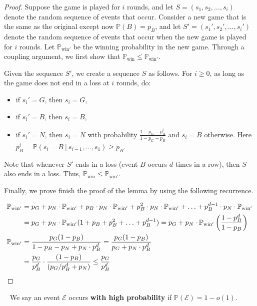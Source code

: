 \documentclass[11pt]{amsart}
\newcommand{\pparagraph}[1]{
\vspace{0.13in}\noindent{\textbf{\boldmath #1}}~}
\renewcommand{\Pr}{\mathbb{P}}
\newcommand{\defn}{\textbf}
\begin{document}
\begin{proof}
Suppose the game is played for $i$ rounds, and let $S = (s_1, s_2, \ldots, s_i)$ denote the random sequence of events that occur.  Consider a new game that is the same as the original except now $\Pr(B) = p_B$, and let $S' = (s_1', s_2', \ldots, s_i')$ denote the random sequence of events that occur when the new game is played for $i$ rounds.  
Let $\Pr_{\text{win}'}$ be the winning probability in the new game.  Through a coupling argument, we first show that 
$\Pr_{\text{win}} \leq \Pr_{\text{win}'}$.

Given the sequence $S'$, we create a sequence $S$ as follows.  For $i\geq 0$, as long as the game does not end in a loss at $i$ rounds, do:
\begin{itemize}
    \item if $s_i' = G$, then $s_i = G$,
    \item if $s_i' = B$, then $s_i = B$,
    \item if $s_i' = N$, then $s_i = N$ with probability $\frac{1 - p_G - p_B^i}{1 - p_G - p_B}$ and $s_i = B$ otherwise.  
    Here $p_B^i = \Pr(s_i = B~|~ s_{i-1}, \ldots, s_1) \geq p_B$.  
\end{itemize}
Note that whenever $S'$ ends in a loss (event $B$ occurs $d$ times in a row), then $S$ also ends in a loss.   Thus, $\Pr_{\text{win}} \leq \Pr_{\text{win}'}$.  

Finally, we prove finish the proof of the lemma by using the following recurrence.


\begin{align*}
\Pr_{\text{win}'} &= p_G + p_N \cdot \Pr_{\text{win}'} + p_B \cdot p_N \cdot \Pr_{\text{win}'} + p_B^2 \cdot p_N \cdot \Pr_{\text{win}'}  + \ldots +  p_B^{d-1} \cdot p_N \cdot \Pr_{\text{win}'}\\
&= p_G + p_N \cdot \Pr_{\text{win}'} (1  + p_B + p_B^2 + \ldots + p_B^{d-1}) = p_G + p_N \cdot 
\Pr_{\text{win}'} \left( \frac{1- p_B^d}{1-p_B}\right)\\
\Pr_{\text{win}'} &= \frac{p_G(1-p_B)}{1 - p_B - p_N + p_N \cdot p_B^d} = \frac{p_G(1-p_B)}{p_G + p_N \cdot p_B^d} \\
&= \frac{p_G}{p_B^d} \cdot \frac{(1-p_B)}{(p_G/p_B^d+p_N) }
\leq \frac{p_G}{p_B^d}\qedhere
\end{align*}

\end{proof}

\pparagraph{Notation.}  
We say an event $\mathcal{E}$ occurs \defn{with high probability} if $\mathbb{P}(\mathcal{E}) = 1-o(1)$. 
\end{document}
